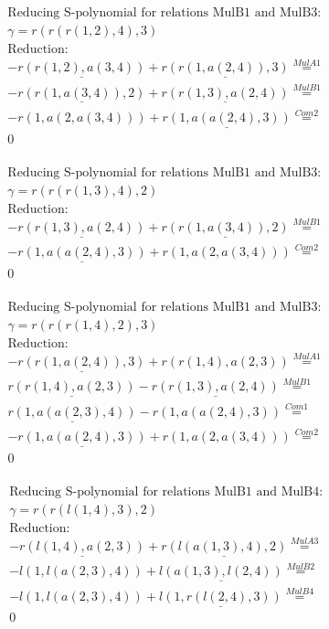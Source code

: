 \documentclass[11pt]{amsart}
\begin{document}
\begin{align*} 
& \text{Reducing S-polynomial for relations MulB1 and MulB3:} \\ 
& \gamma = r(r(r(1,2),4),3) \\ 
& \text{Reduction}: \\& - \underline{r(r(1,2),a(3,4))} + \underline{r(r(1,a(2,4)),3)} \stackrel{ MulA1 }{=}  \\ 
& - \underline{r(r(1,a(3,4)),2)} + \underline{r(r(1,3),a(2,4))} \stackrel{ MulB1 }{=}  \\ 
& - r(1,a(2,a(3,4))) + \underline{r(1,a(a(2,4),3))} \stackrel{ Com2 }{=}  \\ 
&0\\ 
\end{align*} 
 
\begin{align*} 
& \text{Reducing S-polynomial for relations MulB1 and MulB3:} \\ 
& \gamma = r(r(r(1,3),4),2) \\ 
& \text{Reduction}: \\& - \underline{r(r(1,3),a(2,4))} + \underline{r(r(1,a(3,4)),2)} \stackrel{ MulB1 }{=}  \\ 
& - \underline{r(1,a(a(2,4),3))} + r(1,a(2,a(3,4))) \stackrel{ Com2 }{=}  \\ 
&0\\ 
\end{align*} 
 
\begin{align*} 
& \text{Reducing S-polynomial for relations MulB1 and MulB3:} \\ 
& \gamma = r(r(r(1,4),2),3) \\ 
& \text{Reduction}: \\& - \underline{r(r(1,a(2,4)),3)} + r(r(1,4),a(2,3)) \stackrel{ MulA1 }{=}  \\ 
&\underline{r(r(1,4),a(2,3))} - \underline{r(r(1,3),a(2,4))} \stackrel{ MulB1 }{=}  \\ 
&\underline{r(1,a(a(2,3),4))} - r(1,a(a(2,4),3)) \stackrel{ Com1 }{=}  \\ 
& - \underline{r(1,a(a(2,4),3))} + r(1,a(2,a(3,4))) \stackrel{ Com2 }{=}  \\ 
&0\\ 
\end{align*} 
 
\begin{align*} 
& \text{Reducing S-polynomial for relations MulB1 and MulB4:} \\ 
& \gamma = r(r(l(1,4),3),2) \\ 
& \text{Reduction}: \\& - \underline{r(l(1,4),a(2,3))} + \underline{r(l(a(1,3),4),2)} \stackrel{ MulA3 }{=}  \\ 
& - l(1,l(a(2,3),4)) + \underline{l(a(1,3),l(2,4))} \stackrel{ MulB2 }{=}  \\ 
& - l(1,l(a(2,3),4)) + \underline{l(1,r(l(2,4),3))} \stackrel{ MulB4 }{=}  \\ 
&0\\ 
\end{align*} 
 
\end{document}

